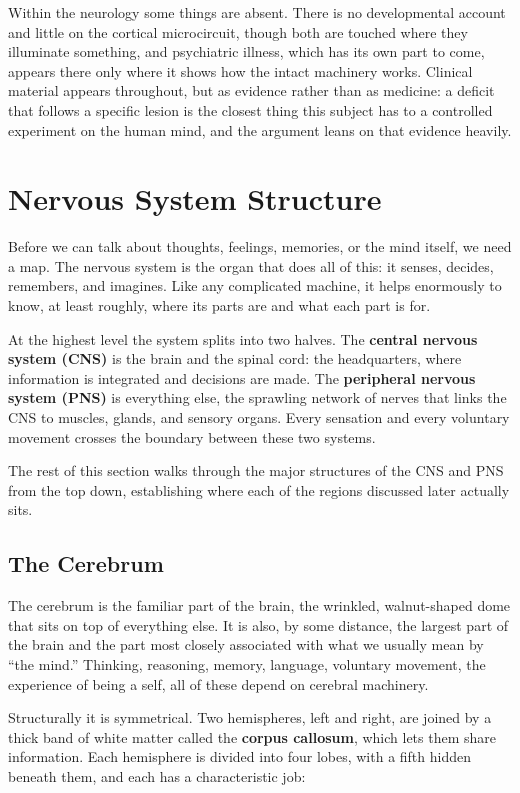 \documentclass[11pt]{article}
\begin{document}
Within the neurology some things are absent. There is no developmental account and little on the cortical microcircuit, though both are touched where they illuminate something, and psychiatric illness, which has its own part to come, appears there only where it shows how the intact machinery works. Clinical material appears throughout, but as evidence rather than as medicine: a deficit that follows a specific lesion is the closest thing this subject has to a controlled experiment on the human mind, and the argument leans on that evidence heavily.

\section{Nervous System Structure}

Before we can talk about thoughts, feelings, memories, or the mind itself, we need a map. The nervous system is the organ that does all of this: it senses, decides, remembers, and imagines. Like any complicated machine, it helps enormously to know, at least roughly, where its parts are and what each part is for.

At the highest level the system splits into two halves. The \textbf{central nervous system (CNS)} is the brain and the spinal cord: the headquarters, where information is integrated and decisions are made. The \textbf{peripheral nervous system (PNS)} is everything else, the sprawling network of nerves that links the CNS to muscles, glands, and sensory organs. Every sensation and every voluntary movement crosses the boundary between these two systems.

The rest of this section walks through the major structures of the CNS and PNS from the top down, establishing where each of the regions discussed later actually sits.

\subsection{The Cerebrum}

The cerebrum is the familiar part of the brain, the wrinkled, walnut-shaped dome that sits on top of everything else. It is also, by some distance, the largest part of the brain and the part most closely associated with what we usually mean by ``the mind.'' Thinking, reasoning, memory, language, voluntary movement, the experience of being a self, all of these depend on cerebral machinery.

Structurally it is symmetrical. Two hemispheres, left and right, are joined by a thick band of white matter called the \textbf{corpus callosum}, which lets them share information. Each hemisphere is divided into four lobes, with a fifth hidden beneath them, and each has a characteristic job:
\end{document}
